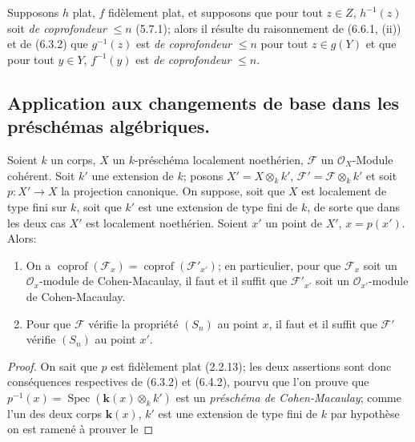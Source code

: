 \begin{remark}[6.6.2]
\label{IV.2.s6.6.2-fr}
Supposons $h$ plat, $f$ fidèlement plat, et supposons que pour tout
$z\in Z$, $h^{-1}(z)$ soit \emph{de coprofondeur} $\leqslant n$ (5.7.1); alors
il résulte du raisonnement de (6.6.1, (ii)) et de (6.3.2) que
$g^{-1}(z)$ est \emph{de coprofondeur} $\leqslant n$ pour tout $z\in g(Y)$ et
que pour tout $y\in Y$, $f^{-1}(y)$ est \emph{de coprofondeur} $\leqslant n$.
\end{remark}

\subsection{Application aux changements de base dans les préschémas algébriques.}

\begin{proposition}[6.7.1]
\label{IV.2.s6.7.1-fr}
Soient $k$ un corps, $X$ un $k$-préschéma localement noethérien,
$\mathscr F$ un $\mathcal O_X$-Module cohérent. Soit $k'$ une extension
de $k$; posons $X'=X\otimes_k k'$, $\mathscr F'=\mathscr F\otimes_k k'$
et soit $p:X'\to X$ la projection canonique. On suppose, soit que
$X$ est localement de type fini sur $k$, soit que $k'$ est une extension
de type fini de $k$, de sorte que dans les deux cas $X'$ est localement
noethérien. Soient $x'$ un point de $X'$, $x=p(x')$. Alors:
\begin{enumerate}
\item[\textup{(i)}] On a $\operatorname{coprof}(\mathscr F_x)=
\operatorname{coprof}(\mathscr F'_{x'})$; en particulier, pour que
$\mathscr F_x$ soit un $\mathcal O_x$-module de Cohen-Macaulay, il
faut et il suffit que $\mathscr F'_{x'}$ soit un
$\mathcal O_{x'}$-module de Cohen-Macaulay.
\item[\textup{(ii)}] Pour que $\mathscr F$ vérifie la propriété $(S_n)$ au point
$x$, il faut et il suffit que $\mathscr F'$ vérifie $(S_n)$ au point
$x'$.
\end{enumerate}
\end{proposition}


\begin{proof}
On sait que $p$ est fidèlement plat (2.2.13); les deux assertions sont
donc conséquences respectives de (6.3.2) et (6.4.2), pourvu que l'on
prouve que $p^{-1}(x)=\operatorname{Spec}(\boldsymbol{k}(x)\otimes_k k')$ est un
\emph{préschéma de Cohen-Macaulay}; comme l'un des deux corps $\boldsymbol{k}(x)$, $k'$ est
une extension de type fini de $k$ par hypothèse on est ramené à prouver
le
\end{proof}

